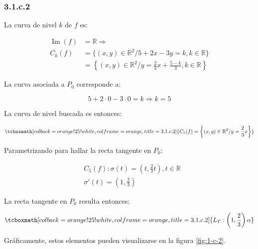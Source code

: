 \documentclass{article}
\renewcommand{\Bbb}{\mathbb}
\begin{document}
\subsubsection*{3.1.c.2}
\label{subsubsec:3.1.c.2}

La curva de nivel $k$ de $f$ es:

\begin{subequations}
\begin{align}
\mathop{Im}(f) &= \Bbb R \Rightarrow \\
C_k(f) &= \{ (x,y) \in \Bbb R^2 / 5 +2x -3y = k, k \in \Bbb R \} \\
       &= \left\{ (x,y) \in \Bbb R^2 / y = \frac{2}{3} x + \frac{5-k}{3}, k \in \Bbb R \right\}
\end{align}
\end{subequations}

La curva asociada a $P_0$ corresponde a:

\begin{equation}
5 + 2 \cdot 0 - 3 \cdot 0 = k \Rightarrow k = 5
\end{equation}

La curva de nivel buscada es entonces:

\begin{equation}
\tcboxmath[colback=orange!25!white,colframe=orange,title=3.1.c.2]
{
C_{5}(f) = \left\{ (x,y) \in \Bbb R^2 / y = \frac{2}{3} x \right\}
}
\end{equation}

Parametrizando para hallar la recta tangente en $P_0$:

\begin{subequations}
\begin{align}
& C_{5}(f): \sigma(t) = \left( t, \frac{2}{3}t \right), t \in \Bbb R \\
& \sigma'(t) = \left( 1, \frac{2}{3} \right)
\end{align}
\end{subequations}

La recta tangente en $P_0$ resulta entonces:

\begin{equation}
\tcboxmath[colback=orange!25!white,colframe=orange,title=3.1.c.2]
{
L_T: \left( 1, \frac{2}{3} \right) \alpha
}
\end{equation}

Gráficamente, estos elementos pueden visualizarse en la figura \ref{fig:1-c-2}.
\end{document}
